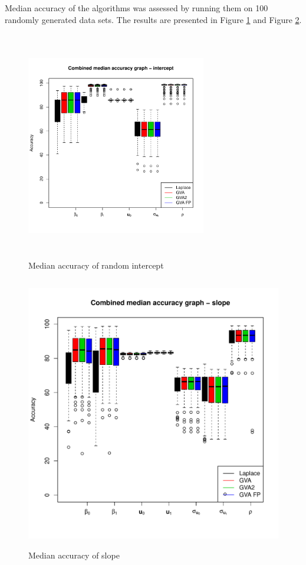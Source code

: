 \documentclass{article}[12pt]
\begin{document}
	
	Median accuracy of the algorithms was assessed by running them on 100 randomly generated data sets. The
	results are presented in Figure \ref{fig:median_accuracy_intercept} and Figure
	\ref{fig:median_accuracy_slope}.
	
	\begin{figure}
		\begin{center}
			\includegraphics[width=0.7\textwidth, height=100mm]{code/results/median_accuracy_combined_intercept.pdf}
			\caption{Median accuracy of random intercept}
			\label{fig:median_accuracy_intercept}
		\end{center}
	\end{figure}
	
	\begin{figure}
		\caption{Median accuracy of slope}
		\label{fig:median_accuracy_slope}
		\includegraphics[width=120mm, height=120mm]{code/results/median_accuracy_combined_slope.pdf}
	\end{figure}
	
\end{document}

